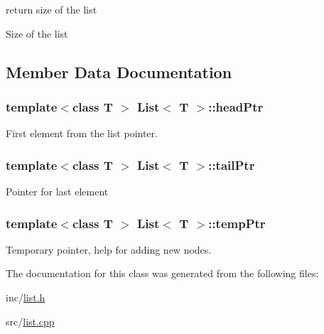 return size of the list 

Size of the list 

\subsection{Member Data Documentation}
\hypertarget{class_list_a458d07dddccbd1f2658c507ae4a88b85}{}
\subsubsection[{head\+Ptr}]{\setlength{\rightskip}{0pt plus 5cm}template$<$class T $>$ {\bf List}$<$ T $>$\+::head\+Ptr\hspace{0.3cm}{\ttfamily [private]}}\label{class_list_a458d07dddccbd1f2658c507ae4a88b85}
First element from the list pointer. \hypertarget{class_list_ae2eb29a2f13bad16ac2617217576e3ea}{}
\subsubsection[{tail\+Ptr}]{\setlength{\rightskip}{0pt plus 5cm}template$<$class T $>$ {\bf List}$<$ T $>$\+::tail\+Ptr\hspace{0.3cm}{\ttfamily [private]}}\label{class_list_ae2eb29a2f13bad16ac2617217576e3ea}
Pointer for last element \hypertarget{class_list_a9a6f2723e2a68e2193850ff649b126d4}{}
\subsubsection[{temp\+Ptr}]{\setlength{\rightskip}{0pt plus 5cm}template$<$class T $>$ {\bf List}$<$ T $>$\+::temp\+Ptr\hspace{0.3cm}{\ttfamily [private]}}\label{class_list_a9a6f2723e2a68e2193850ff649b126d4}
Temporary pointer, help for adding new nodes. 

The documentation for this class was generated from the following files\+:\begin{DoxyCompactItemize}
\item 
inc/\hyperlink{list_8h}{list.\+h}\item 
src/\hyperlink{list_8cpp}{list.\+cpp}\end{DoxyCompactItemize}
